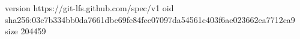 version https://git-lfs.github.com/spec/v1
oid sha256:03c7b334bb0da7661dbc69fe84fec07097da54561c403f6ae023662ea7712ca9
size 204459
